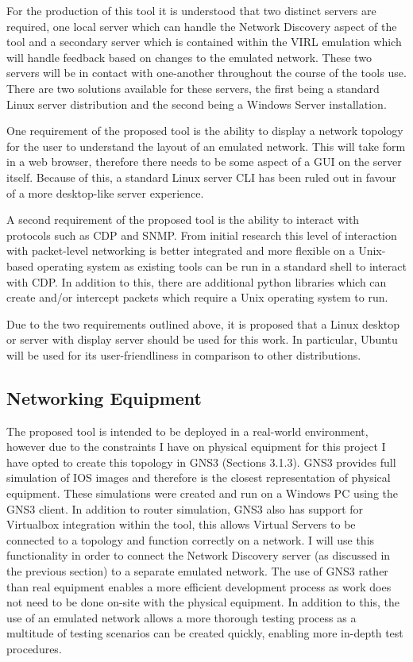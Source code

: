 \documentclass[11pt]{report}
\begin{document}
For the production of this tool it is understood that two distinct servers are required, one local server which can handle the Network Discovery aspect of the tool and a secondary server which is contained within the VIRL emulation which will handle feedback based on changes to the emulated network. These two servers will be in contact with one-another throughout the course of the tools use. There are two solutions available for these servers, the first being a standard Linux server distribution and the second being a Windows Server installation.

One requirement of the proposed tool is the ability to display a network topology for the user to understand the layout of an emulated network. This will take form in a web browser, therefore there needs to be some aspect of a GUI on the server itself. Because of this, a standard Linux server CLI has been ruled out in favour of a more desktop-like server experience.

A second requirement of the proposed tool is the ability to interact with protocols such as CDP and SNMP. From initial research this level of interaction with packet-level networking is better integrated and more flexible on a Unix-based operating system as existing tools can be run in a standard shell to interact with CDP. In addition to this, there are additional python libraries which can create and/or intercept packets which require a Unix operating system to run.

Due to the two requirements outlined above, it is proposed that a Linux desktop or server with display server should be used for this work. In particular, Ubuntu will be used for its user-friendliness in comparison to other distributions.

\subsection{Networking Equipment}

The proposed tool is intended to be deployed in a real-world environment, however due to the constraints I have on physical equipment for this project I have opted to create this topology in GNS3 (Sections 3.1.3). GNS3 provides full simulation of IOS images and therefore is the closest representation of physical equipment. These simulations were created and run on a Windows PC using the GNS3 client. In addition to router simulation, GNS3 also has support for Virtualbox integration within the tool, this allows Virtual Servers to be connected to a topology and function correctly on a network. I will use this functionality in order to connect the Network Discovery server (as discussed in the previous section) to a separate emulated network. The use of GNS3 rather than real equipment enables a more efficient development process as work does not need to be done on-site with the physical equipment. In addition to this, the use of an emulated network allows a more thorough testing process as a multitude of testing scenarios can be created quickly, enabling more in-depth test procedures.
\end{document}
